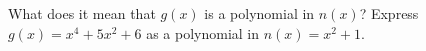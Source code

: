 What does it mean that $g(x)$ is a polynomial in $n(x)$? Express $g(x)=x^4+5x^2+6$ as a polynomial in $n(x)=x^2+1$.
